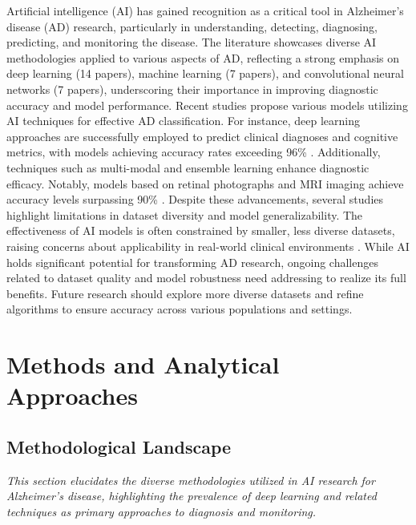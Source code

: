 \documentclass{MITcsail}
\begin{document}
Artificial intelligence (AI) has gained recognition as a critical tool in Alzheimer’s disease (AD) research, particularly in understanding, detecting, diagnosing, predicting, and monitoring the disease. The literature showcases diverse AI methodologies applied to various aspects of AD, reflecting a strong emphasis on deep learning (14 papers), machine learning (7 papers), and convolutional neural networks (7 papers), underscoring their importance in improving diagnostic accuracy and model performance. Recent studies propose various models utilizing AI techniques for effective AD classification. For instance, deep learning approaches are successfully employed to predict clinical diagnoses and cognitive metrics, with models achieving accuracy rates exceeding 96\% \citep{ref_10_1016_j_neuroimage_2020_117203,ref_10_3389_fpubh_2022_834032}. Additionally, techniques such as multi-modal and ensemble learning enhance diagnostic efficacy. Notably, models based on retinal photographs and MRI imaging achieve accuracy levels surpassing 90\% \citep{ref_10_1016_s2589_7500_22_00169_8,ref_10_1016_j_mri_2021_02_001}. Despite these advancements, several studies highlight limitations in dataset diversity and model generalizability. The effectiveness of AI models is often constrained by smaller, less diverse datasets, raising concerns about applicability in real-world clinical environments \citep{ref_10_1002_alz_13390,ref_10_1016_j_ejrad_2023_110934}. While AI holds significant potential for transforming AD research, ongoing challenges related to dataset quality and model robustness need addressing to realize its full benefits. Future research should explore more diverse datasets and refine algorithms to ensure accuracy across various populations and settings.

\section{Methods and Analytical Approaches}

\subsection{Methodological Landscape}

\textit{This section elucidates the diverse methodologies utilized in AI research for Alzheimer's disease, highlighting the prevalence of deep learning and related techniques as primary approaches to diagnosis and monitoring.}
\end{document}
